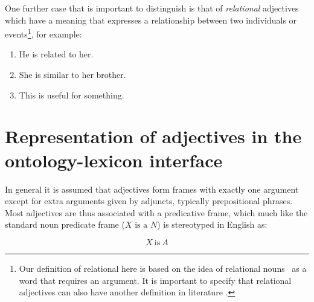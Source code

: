 \documentclass[11pt]{article}
\begin{document}
One further case that is important to distinguish is that of \emph{relational} adjectives which have a meaning 
that expresses a relationship between two individuals or events\footnote{Our definition of relational here is based on the idea of
    relational nouns~\cite{de1988interpretation} as a word that requires an argument. 
    It is important to specify that relational adjectives can also have another definition in literature \cite{morzycki2013nonscales}.}, for example:

\begin{enumerate}
\item He is related to her.
\item She is similar to her brother. 
\item This is useful for something. 
\end{enumerate}


\section{Representation of adjectives in the ontology-lexicon interface}

In general it is assumed that adjectives form frames with exactly one argument 
except for extra arguments given by adjuncts, typically prepositional phrases. 
Most adjectives are thus associated with a predicative frame, which much
like the standard noun predicate frame ($X\text{ is a }N$) is stereotyped in English as:

\vspace{-1.0em}
$$X\mathrm{~is~}A$$
\vspace{-1.5em}
\end{document}
